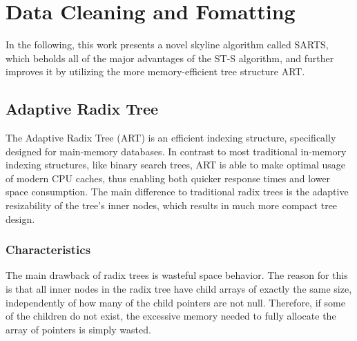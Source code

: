\chapter{Data Cleaning and Fomatting} \label{chapter:data-cleaning}
In the following, this work presents a novel skyline algorithm called SARTS, which beholds all of the major advantages of the ST-S algorithm, and further improves it by utilizing the more memory-efficient tree structure ART. 

\section{Adaptive Radix Tree} \label{section:art}
The Adaptive Radix Tree (ART) \cite{art} is an efficient indexing structure, specifically designed for main-memory databases. In contrast to most traditional in-memory indexing structures, like binary search trees, ART is able to make optimal usage of modern CPU caches, thus enabling both quicker response times and lower space consumption. The main difference to traditional radix trees is the adaptive resizability of the tree's inner nodes, which results in much more compact tree design. 

\subsection{Characteristics} \label{section:art-characteristics}
The main drawback of radix trees is wasteful space behavior. The reason for this is that all inner nodes in the radix tree have child arrays of exactly the same size, independently of how many of the child pointers are not null. Therefore, if some of the children do not exist, the excessive memory needed to fully allocate the array of pointers is simply wasted. 

